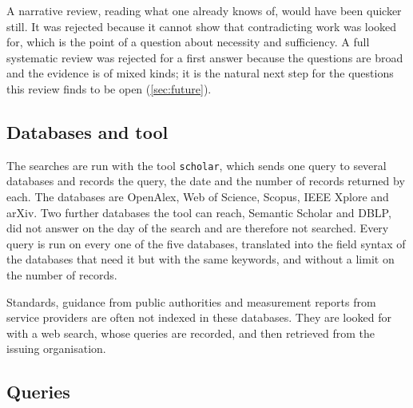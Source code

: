 A narrative review, reading what one already knows of, would have been
quicker still.
It was rejected because it cannot show that contradicting work was
looked for, which is the point of a question about necessity and
sufficiency.
A full systematic review was rejected for a first answer because the
questions are broad and the evidence is of mixed kinds; it is the natural
next step for the questions this review finds to be open
(\cref{sec:future}).

\subsection{Databases and tool}\label{sec:sources}

The searches are run with the tool \texttt{scholar}\autocite{scholarcli},
which sends one query to several databases and records the query, the date and the
number of records returned by each.
The databases are OpenAlex, Web of Science, Scopus, IEEE Xplore and
arXiv.
Two further databases the tool can reach, Semantic Scholar and DBLP, did
not answer on the day of the search and are therefore not searched.
Every query is run on every one of the five databases, translated into
the field syntax of the databases that need it but with the same
keywords, and without a limit on the number of records.

Standards, guidance from public authorities and measurement reports from
service providers are often not indexed in these databases.
They are looked for with a web search, whose queries are recorded, and
then retrieved from the issuing organisation.

\subsection{Queries}\label{sec:queries}

